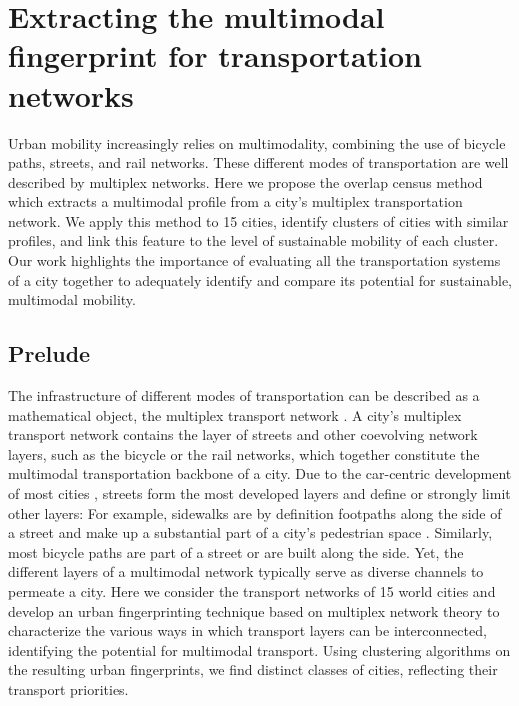 \chapter{Extracting the multimodal fingerprint for transportation networks}

Urban mobility increasingly relies on multimodality, combining the use of bicycle paths, streets, and rail networks. These different modes of transportation are well described by multiplex networks. Here we propose the overlap census method which extracts a multimodal profile from a city's multiplex transportation network. We apply this method to 15 cities, identify clusters of cities with similar profiles, and link this feature to the level of sustainable mobility of each cluster. Our work highlights the importance of evaluating all the transportation systems of a city together to adequately identify and compare its potential for sustainable, multimodal mobility.


\section{Prelude}
The infrastructure of different modes of transportation can be described as a mathematical object, the multiplex transport network \cite{Morris2012Transport,Strano2012Evolution,Barthelemy2013Evolution,Battiston2014Structural,Gallotti2014Efficiency,DeDomenico2014Navigability,Strano2015Features,Aleta2017Multilayer,Lee2017Morphology}. A city's multiplex transport network contains the layer of streets and other coevolving network layers, such as the bicycle or the rail networks, which together constitute the multimodal transportation backbone of a city. Due to the car-centric development of most cities \cite{Jacobs1961Death}, streets form the most developed layers \cite{Gossling2016Distribution,Szell2018Crowdsourced} and define or strongly limit other layers: For example, sidewalks are by definition footpaths along the side of a street and make up a substantial part of a city's pedestrian space \cite{Gossling2016Distribution}. Similarly, most bicycle paths are part of a street or are built along the side. Yet, the different layers of a multimodal network typically serve as diverse channels to permeate a city. Here we consider the transport networks of 15 world cities and develop an urban fingerprinting technique based on multiplex network theory to characterize the various ways in which transport layers can be interconnected, identifying the potential for multimodal transport. Using clustering algorithms on the resulting urban fingerprints, we find distinct classes of cities, reflecting their transport priorities.

